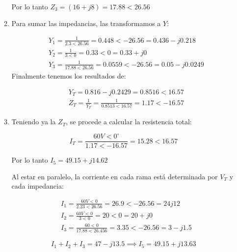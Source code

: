 \begin{enumerate}
\begin{enumerate}
		            Por lo tanto $Z_3=(16+j8)=17.88<26.56$

		      \item Para sumar las impedancias, las transformamos a $Y$:

		            \begin{align*}
			             & Y_1=\frac{1}{2.3<26.56}=0.448<-26.56=0.436-j0.218    \\
			             & Y_2=\frac{1}{3<0}=0.33<0=0.33+j0                     \\
			             & Y_3=\frac{1}{17.88<26.56}=0.0559<-26.56=0.05-j0.0249
		            \end{align*}
		            Finalmente tenemos los resultados de:

		            \begin{align}
			             & Y_T=0.816-j0.2429=0.8516<16.57                       \\
			             & Z_T=\frac{1}{Y_T}=\frac{1}{0.8513<16.57}=1.17<-16.57
		            \end{align}

		      \item Teniendo ya la $Z_T$, se procede a calcular la resistencia total:

		            \begin{equation*}
			            I_T=\frac{60V<0^{\circ}}{1.17<-16.57}=15.28<16.57
		            \end{equation*}

		            Por lo tanto $I_5=49.15+j14.62$

		            Al estar en paralelo, la corriente en cada rama está determinada por $V_T$ y cada impedancia:

		            \begin{align*}
			             & I_1=\frac{60V<0}{2.23<26.56}=26.9<-26.56=24j12   \\
			             & I_2=\frac{60V<0}{3<0}=20<0=20+j0                 \\
			             & I_3=\frac{60<0}{17.88<26.456}=3.35<-26.56=3-j1.5
		            \end{align*}

		            \begin{equation}
			            I_1+I_2+I_3=47-j13.5\implies I_5=49.15+j13.63
		            \end{equation}
	      \end{enumerate}
\end{enumerate}